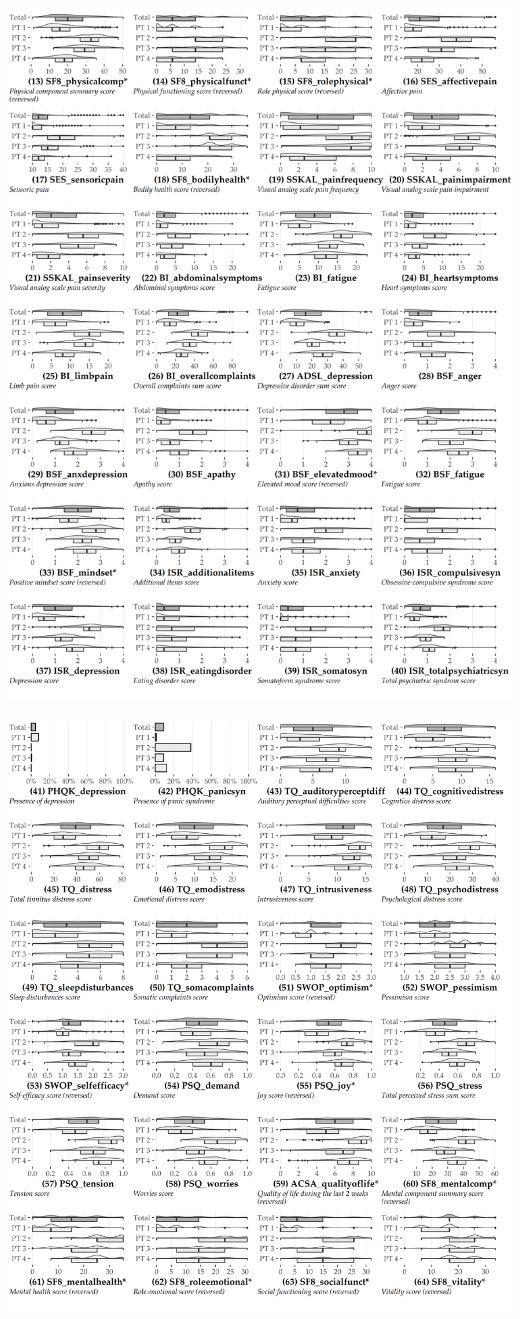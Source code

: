 \documentclass[
  oneside]{book}
\begin{document}
\begin{center}\includegraphics[width=1\linewidth]{figures/93-p2} \end{center}

\begin{center}\includegraphics[width=1\linewidth]{figures/93-p3} \end{center}

\printbibliography
\end{document}
